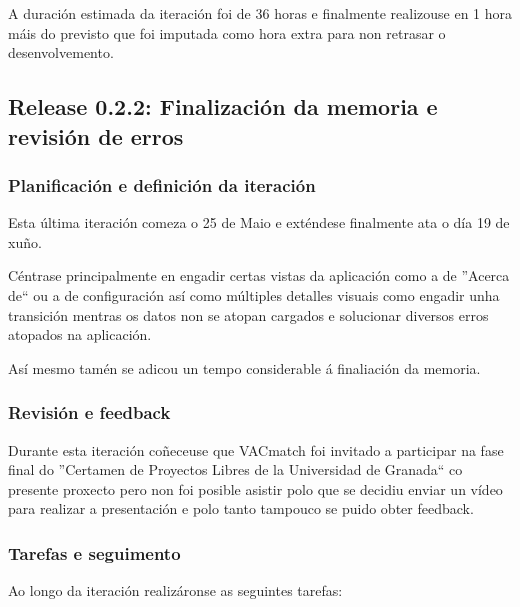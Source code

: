         A duración estimada da iteración foi de 36 horas e finalmente 
realizouse en 1 hora máis do previsto que foi imputada como hora extra para non 
retrasar o desenvolvemento.

    \subsection{Release 0.2.2: Finalización da memoria e revisión de erros}

      \subsubsection{Planificación e definición da iteración}
      Esta última iteración comeza o 25 de Maio e exténdese finalmente ata o 
día 19 de xuño.

      Céntrase principalmente en engadir certas vistas da 
aplicación como a de ''Acerca de`` ou a de configuración así como múltiples 
detalles visuais como engadir unha transición mentras os datos non se atopan 
cargados e solucionar diversos erros atopados na aplicación.

      Así mesmo tamén se adicou un tempo considerable á finaliación da memoria.

      \subsubsection{Revisión e feedback}
      Durante esta iteración coñeceuse que VACmatch foi invitado a 
participar na fase final do ''Certamen de Proyectos Libres de la Universidad de 
Granada`` co presente proxecto pero non foi posible asistir polo que se decidiu 
enviar un vídeo para realizar a presentación e polo tanto tampouco se puido 
obter feedback.

      \subsubsection{Tarefas e seguimento}

      Ao longo da iteración realizáronse as seguintes tarefas:

